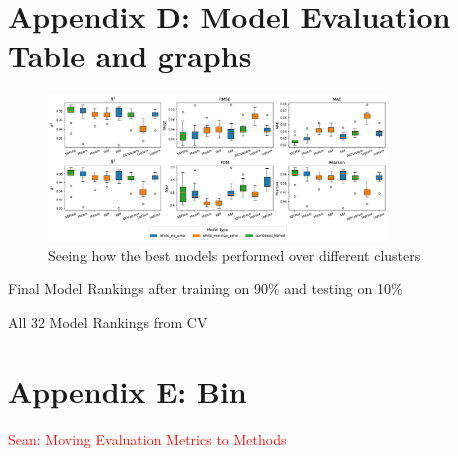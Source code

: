 \documentclass[12pt]{article}
\newcommand{\Sean}[1]{{\textcolor{red}{{Sean: #1}} }}
\begin{document}
\section{Appendix D: Model Evaluation Table and graphs}
\label{appendix:D}

\begin{figure}[H]
    \centering
    \includegraphics[width=0.8\textwidth]{LatexPlots/CV_plots/boxplots.png}
    \caption{Seeing how the best models performed over different clusters}
    \label{fig:boxplots}
\end{figure}

\begin{table}[H]
    \centering
    \caption{Final Model Rankings after training on 90\% and testing on 10\%}
    {\fontsize{7}{9.5}\selectfont
    }
    \label{tab:finalmadelsrankingtable}
\end{table}



\begin{table}[H]
    \centering
    \caption{All 32 Model Rankings from CV}
    {\fontsize{7}{9.5}\selectfont
    }
    \label{tab:rankingtable}
\end{table}
    

\section{Appendix E: Bin}
\label{appendix:bin}
\Sean{Moving Evaluation Metrics to Methods}
\end{document}
